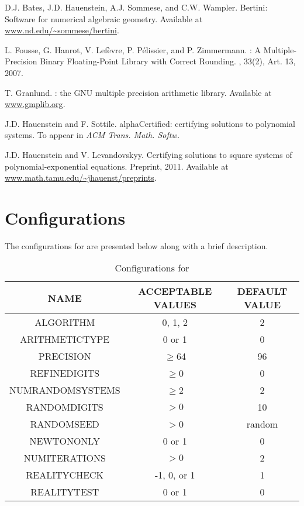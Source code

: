 \documentclass[11pt]{report}
\begin{document}
\begin{thebibliography}{1}

D.J. Bates, J.D. Hauenstein, A.J. Sommese, and C.W. Wampler.
\newblock Bertini: Software for numerical algebraic geometry.
\newblock Available at \url{www.nd.edu/\~sommese/bertini}.

L. Fousse, G. Hanrot, V. Lef\`evre, P. P\'elissier, and P. Zimmermann.
: A Multiple-Precision Binary Floating-Point Library with Correct Rounding.
, 33(2), Art. 13, 2007.

T. Granlund.
: the GNU multiple precision arithmetic library.
\newblock Available at \url{www.gmplib.org}.

J.D. Hauenstein and F. Sottile.
\newblock alphaCertified: certifying solutions to polynomial systems.
\newblock To appear in {\em ACM Trans. Math. Softw.}

J.D. Hauenstein and V. Levandovskyy.
\newblock Certifying solutions to square systems of polynomial-exponential equations.
\newblock Preprint, 2011. Available at \url{www.math.tamu.edu/\~jhauenst/preprints}.


\end{thebibliography}

\appendix
\chapter{Configurations}\label{CHAP:configs}

\vskip -0.2in
The configurations for \alphaCertifiedS are presented below
along with a brief description.

\begin{table}[h!]\label{good_settings}
\centering
\caption{Configurations for \alphaCertified}
\begin{tabular}{|c|c|c|}
\hline
NAME & ACCEPTABLE VALUES & DEFAULT VALUE\\
\hline
\hline
ALGORITHM & 0, 1, 2 & 2\\
\hline
ARITHMETICTYPE & 0 or 1 & 0\\
\hline
PRECISION & $\geq$64 & 96\\
\hline
REFINEDIGITS & $\geq$0 & 0 \\
\hline
NUMRANDOMSYSTEMS & $\geq$2 & 2 \\
\hline
RANDOMDIGITS & $>0$ & 10 \\
\hline
RANDOMSEED & $>$0 & random \\
\hline
NEWTONONLY & 0 or 1 & 0 \\
\hline
NUMITERATIONS & $>0$ & 2 \\
\hline
REALITYCHECK & -1, 0, or 1 & 1 \\
\hline
REALITYTEST & 0 or 1 & 0 \\
\hline
\end{tabular}
\end{table}
\end{document}
